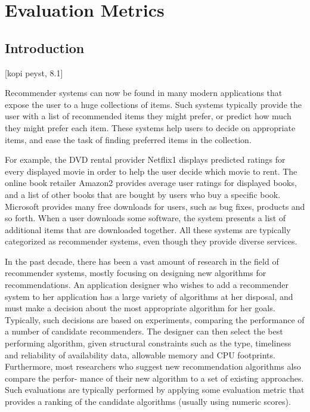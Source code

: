
\section{Evaluation Metrics}\label{section:evaluation_metrics}

\subsection{Introduction}
[kopi peyst, 8.1]

Recommender systems can now be found in many modern applications that expose the user to a huge collections of items. Such systems typically provide the user with a list of recommended items they might prefer, or predict how much they might prefer each item. These systems help users to decide on appropriate items, and ease the task of finding preferred items in the collection.

For example, the DVD rental provider Netflix1 displays predicted ratings for every displayed movie in order to help the user decide which movie to rent. The online book retailer Amazon2 provides average user ratings for displayed books, and a list of other books that are bought by users who buy a specific book. Microsoft provides many free downloads for users, such as bug fixes, products and so forth. When a user downloads some software, the system presents a list of additional items that are downloaded together. All these systems are typically categorized as recommender systems, even though they provide diverse services.

In the past decade, there has been a vast amount of research in the field of recommender systems, mostly focusing on designing new algorithms for recommendations. An application designer who wishes to add a recommender system to her application has a large variety of algorithms at her disposal, and must make a decision about the most appropriate algorithm for her goals. Typically, such decisions are based on experiments, comparing the performance of a number of candidate recommenders. The designer can then select the best performing algorithm, given structural constraints such as the type, timeliness and reliability of availability data, allowable memory and CPU footprints. Furthermore, most researchers who suggest new recommendation algorithms also compare the perfor- mance of their new algorithm to a set of existing approaches. Such evaluations are typically performed by applying some evaluation metric that provides a ranking of the candidate algorithms (usually using numeric scores).

